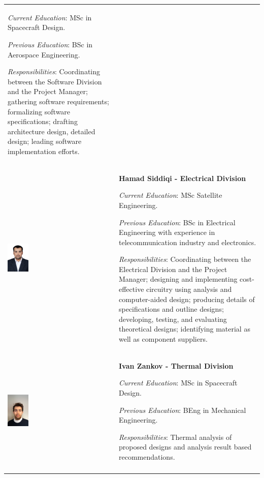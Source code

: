 \documentclass[a4paper,12pt,oneside]{article} %
\begin{document}
\begin{longtable}[]{m{} m{}}
\smallskip
\textit{Current Education}: MSc in Spacecraft Design.

\smallskip
\textit{Previous Education}: BSc in Aerospace Engineering.


\smallskip 
\textit{Responsibilities}: Coordinating between the Software Division and the Project Manager; gathering software requirements; formalizing software specifications; drafting architecture design, detailed design; leading software implementation efforts.
\bigskip
\\

\includegraphics[width=0.2\textwidth]{1-introduction/img/hamad-saddiqi.jpg} & \textbf{Hamad Siddiqi - Electrical Division}


\smallskip
\textit{Current Education}: MSc Satellite Engineering.

\smallskip
\textit{Previous Education}: BSc in Electrical Engineering with experience in telecommunication industry and electronics.

\smallskip
\textit{Responsibilities}: Coordinating between the Electrical Division and the Project Manager; designing and implementing cost-effective circuitry using analysis and computer-aided design; producing details of specifications and outline designs; developing, testing, and evaluating theoretical designs; identifying material as well as component suppliers. 
\bigskip
\\


\includegraphics[width=0.2\textwidth]{1-introduction/img/ivan-zankov.jpg} & \textbf{Ivan Zankov - Thermal Division}

\smallskip
\textit{Current Education}: MSc in Spacecraft Design.

\smallskip
\textit{Previous Education}: BEng in Mechanical Engineering.

\smallskip
\textit{Responsibilities}: Thermal analysis of proposed designs and analysis result based recommendations.                                                         

\\
\label{tab:people}
\end{longtable}
\raggedbottom
\end{document}
